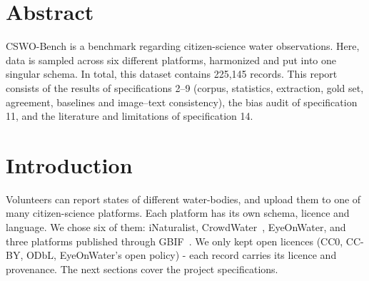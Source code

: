 \section{Abstract}
CSWO-Bench is a benchmark regarding citizen-science water observations. Here, data is sampled across six different platforms,
harmonized and put into one singular schema. In total, this dataset contains 225,145 records.
This report consists of the results of specifications 2--9 (corpus, statistics, extraction,
gold set, agreement, baselines and image--text consistency), the bias audit of specification 11, and the literature
and limitations of specification 14.

\section{Introduction}

Volunteers can report states of different water-bodies, and upload them to one of many citizen-science platforms.
Each platform has its own schema, licence and language. We chose six of them: iNaturalist, CrowdWater~\cite{seibert2019crowdwater}, EyeOnWater, and 
three platforms published through GBIF~\cite{gbif}. We only kept open licences (CC0, CC-BY, ODbL, EyeOnWater's open policy) - each record
carries its licence and provenance. The next sections cover the project specifications.
